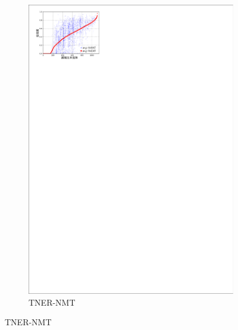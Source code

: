 \begin{figure}[!htbp]
\begin{subfigure}[b]{0.5\textwidth}
      \includegraphics[width=\textwidth]{Img/fig_4_fidelity_tner.pdf}
      \caption{TNER-NMT}
      \label{fig:4_fidelity_tner}
    \end{subfigure}
    \label{fig:4_fidelity}
\end{figure}